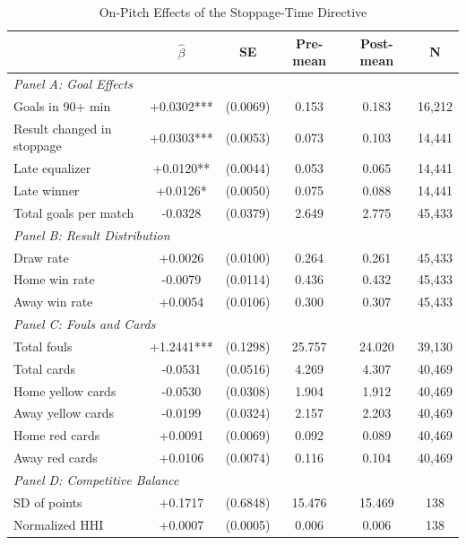 \begin{table}[htbp]
\centering
\caption{On-Pitch Effects of the Stoppage-Time Directive}
\label{tab:onpitch_effects}
\small
\begin{threeparttable}
\begin{tabular}{lccccc}
\toprule
 & $\hat{\beta}$ & SE & Pre-mean & Post-mean & N \\
\midrule
\multicolumn{6}{l}{\textit{Panel A: Goal Effects}} \\
  Goals in 90+ min & +0.0302*** & (0.0069) & 0.153 & 0.183 & 16,212 \\
  Result changed in stoppage & +0.0303*** & (0.0053) & 0.073 & 0.103 & 14,441 \\
  Late equalizer & +0.0120** & (0.0044) & 0.053 & 0.065 & 14,441 \\
  Late winner & +0.0126* & (0.0050) & 0.075 & 0.088 & 14,441 \\
  Total goals per match & -0.0328 & (0.0379) & 2.649 & 2.775 & 45,433 \\
\midrule
\multicolumn{6}{l}{\textit{Panel B: Result Distribution}} \\
  Draw rate & +0.0026 & (0.0100) & 0.264 & 0.261 & 45,433 \\
  Home win rate & -0.0079 & (0.0114) & 0.436 & 0.432 & 45,433 \\
  Away win rate & +0.0054 & (0.0106) & 0.300 & 0.307 & 45,433 \\
\midrule
\multicolumn{6}{l}{\textit{Panel C: Fouls and Cards}} \\
  Total fouls & +1.2441*** & (0.1298) & 25.757 & 24.020 & 39,130 \\
  Total cards & -0.0531 & (0.0516) & 4.269 & 4.307 & 40,469 \\
  Home yellow cards & -0.0530 & (0.0308) & 1.904 & 1.912 & 40,469 \\
  Away yellow cards & -0.0199 & (0.0324) & 2.157 & 2.203 & 40,469 \\
  Home red cards & +0.0091 & (0.0069) & 0.092 & 0.089 & 40,469 \\
  Away red cards & +0.0106 & (0.0074) & 0.116 & 0.104 & 40,469 \\
\midrule
\multicolumn{6}{l}{\textit{Panel D: Competitive Balance}} \\
  SD of points & +0.1717 & (0.6848) & 15.476 & 15.469 & 138 \\
  Normalized HHI & +0.0007 & (0.0005) & 0.006 & 0.006 & 138 \\
\bottomrule
\end{tabular}

\end{threeparttable}
\end{table}
